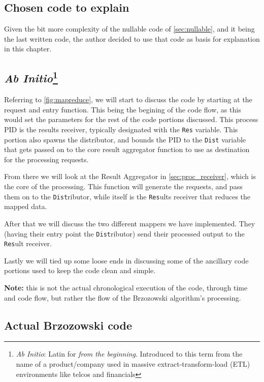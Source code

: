 \subsection{Chosen code to explain}

Given the bit more complexity of the nullable code of
\autoref{sec:nullable}, and it being the last written code, the author
decided to use that code as basis for explanation in this chapter.

\subsection[\emph{Ab Initio}]{\emph{Ab Initio}\footnote{\emph{Ab
      Initio}: Latin for \emph{from the beginning}. Introduced to this
    term from the name of a product/company used in massive
    extract-transform-load (ETL) environments like telcos and
    financials}}

Referring to \autoref{fig:mapreduce}, we will start to discuss the
code by starting at the request and entry function.
This being the begining of the code flow, as this would set the parameters
for the rest of the code portions discussed. This process PID is the
results receiver, typically designated with the \texttt{Res}
variable. This portion also spawns the distributor, and bounds the PID
to the \texttt{Dist} variable that gets passed on to the core result
aggregator function to use as destination for the processing requests.

From there we will look at the Result Aggregator in
\autoref{sec:proc_receiver}, which is the core of the processing. This
function will generate the requests, and pass them on to the
\texttt{Dist}ributor, while itself is the \texttt{Res}ults receiver
that reduces the mapped data.

After that we will discuss the two different mappers we have
implemented. They (having their entry point the \texttt{Dist}ributor)
send their processed output to the \texttt{Res}ult receiver.

Lastly we will tied up some loose ends in discussing some of the
ancillary code portions used to keep the code clean and simple.

\textbf{Note:} this is not the actual chronological execution of the
code, through time and code flow, but rather the flow of the
Brzozowski algorithm's processing.

\subsection{Actual Brzozowski code}


